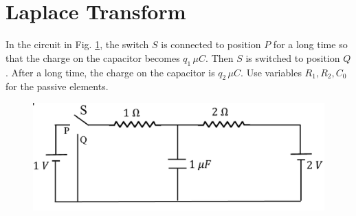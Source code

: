 \documentclass[journal,12pt,twocolumn]{IEEEtran}
\begin{document}
 \section{Laplace Transform}
In the circuit
			in Fig. \ref{fig:cktsig/ckt},
the switch $S$ is connected to position $P$ for a long time so that the charge on the capacitor
	becomes $q_1 \, \mu C$. Then $S$ is switched to position $Q$.  After a long time, the charge on the capacitor is
		$q_2 \, \mu C$.  Use variables $R_1, R_2, C_0$ for 
the passive elements.	
		\begin{figure}[!ht]
			\centering
			\includegraphics[width=\columnwidth]{cktsig/figs/ckt.jpg}
			\caption{}
			\label{fig:cktsig/ckt}
\end{figure}
\end{document}
